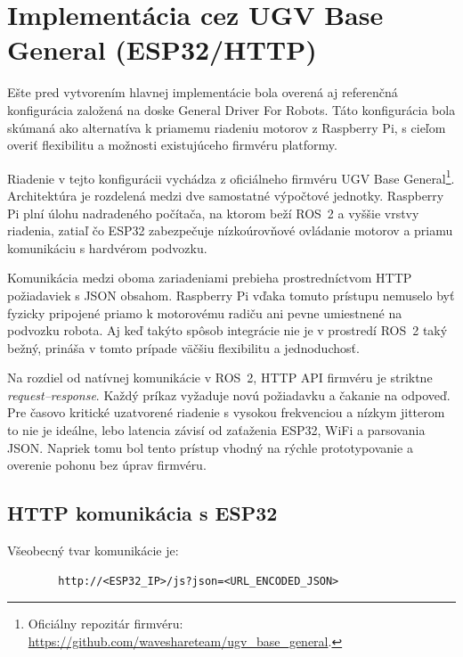        \section{Implementácia cez UGV Base General (\texorpdfstring{ESP32/HTTP}{ESP32--HTTP})}
        \label{sec:ugv_esp32_alternativa}
      
        Ešte pred vytvorením hlavnej implementácie bola overená aj referenčná konfigurácia založená na doske General Driver For Robots. Táto konfigurácia bola skúmaná ako alternatíva k priamemu riadeniu 
        motorov z Raspberry Pi, s cieľom overiť flexibilitu a možnosti 
        existujúceho firmvéru platformy.
      
        Riadenie v tejto konfigurácii vychádza z oficiálneho firmvéru UGV Base General\footnote{Oficiálny repozitár firmvéru: \url{https://github.com/waveshareteam/ugv_base_general}.}. Architektúra je rozdelená medzi dve samostatné výpočtové jednotky. Raspberry Pi plní úlohu nadradeného počítača, na ktorom beží ROS~2 a vyššie vrstvy riadenia, zatiaľ čo ESP32 zabezpečuje nízkoúrovňové ovládanie motorov a priamu komunikáciu s hardvérom podvozku.
      
        Komunikácia medzi oboma zariadeniami prebieha prostredníctvom HTTP požiadaviek s JSON obsahom. Raspberry Pi vďaka tomuto prístupu nemuselo byť fyzicky pripojené priamo k motorovému radiču ani pevne umiestnené na podvozku robota. Aj keď takýto spôsob integrácie nie je v prostredí ROS~2 taký bežný, prináša v tomto  prípade väčšiu flexibilitu a jednoduchosť.
      
        Na rozdiel od natívnej komunikácie v ROS~2, HTTP API firmvéru je striktne \emph{request--response}. Každý príkaz vyžaduje novú požiadavku a čakanie na odpoveď. Pre časovo kritické uzatvorené riadenie s vysokou frekvenciou a nízkym jitterom to nie je ideálne, lebo latencia závisí od zaťaženia ESP32, WiFi a parsovania JSON. Napriek tomu bol tento prístup vhodný na rýchle prototypovanie a overenie pohonu bez úprav firmvéru.
      
        \subsection{HTTP komunikácia s ESP32}
      
        Všeobecný tvar komunikácie je:
      
        \begin{verbatim}
        http://<ESP32_IP>/js?json=<URL_ENCODED_JSON>
        \end{verbatim}
      
